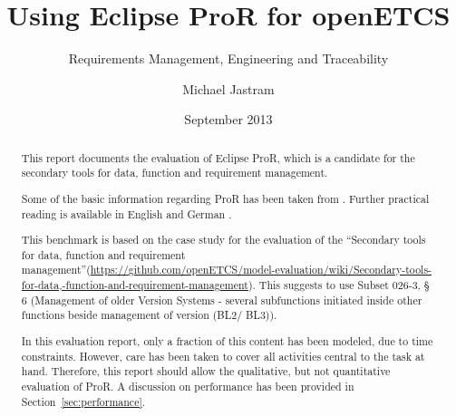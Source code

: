 \documentclass{template/openetcs_report}
\begin{document}
\frontmatter
{}




\title{Using Eclipse ProR for openETCS}

\subtitle{Requirements Management, Engineering and Traceability}

\date{September 2013}

\author{Michael Jastram}





\begin{abstract}
This report documents the evaluation of Eclipse ProR, which is a candidate for the secondary tools for data, function and requirement management.

Some of the basic information regarding ProR has been taken from \cite{RMF_Mark_Book_Jastram_2013}.  Further practical reading is available in English \cite{jastram_forms_2012} and German \cite{reqif_ObjektSpektrum_2013}.

This benchmark is based on the case study for the evaluation of the ``Secondary tools for data, function and requirement management''(\url{https://github.com/openETCS/model-evaluation/wiki/Secondary-tools-for-data,-function-and-requirement-management}).  This suggests to use Subset 026-3, § 6 (Management of older Version Systems - several subfunctions initiated inside other functions beside management of version (BL2/ BL3)).

In this evaluation report, only a fraction of this content has been modeled, due to time constraints.  However, care has been taken to cover all activities central to the task at hand.  Therefore, this report should allow the qualitative, but not quantitative evaluation of ProR.  A discussion on performance has been provided in Section~\ref{sec:performance}.

\end{abstract}
\end{document}
